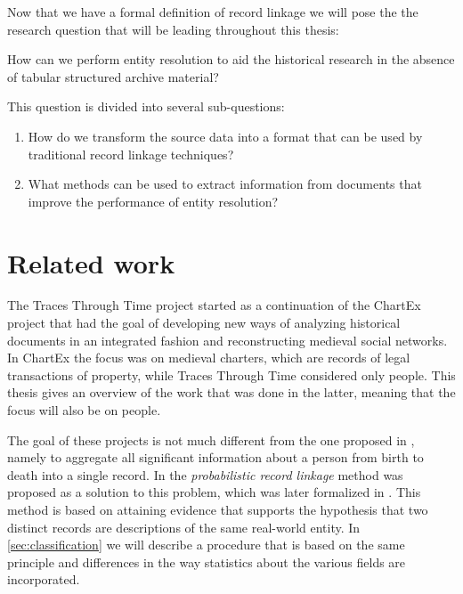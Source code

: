 Now that we have a formal definition of record linkage we will pose the the research question that will be leading throughout this thesis:

\begin{question*}
    How can we perform entity resolution to aid the historical research in the absence of tabular structured archive material?
\end{question*}

\noindent This question is divided into several sub-questions:

\begin{enumerate}[label=\emph{\roman*.}]
    \item How do we transform the source data into a format that can be used by traditional record linkage techniques?
    \item What methods can be used to extract information from documents that improve the performance of entity resolution?
\end{enumerate}




\section{Related work}
\label{sec:related_work}

The Traces Through Time project started as a continuation of the ChartEx \citep{Knobbe2014} project that had the goal of developing new ways of analyzing historical documents in an integrated fashion and reconstructing medieval social networks.
In ChartEx the focus was on medieval charters, which are records of legal transactions of property, while Traces Through Time considered only people.
This thesis gives an overview of the work that was done in the latter, meaning that the focus will also be on people.

The goal of these projects is not much different from the one proposed in \citep{Dunn1946}, namely to aggregate all significant information about a person from birth to death into a single record.
In \citep{Newcombe1959} the \emph{probabilistic record linkage} method was proposed as a solution to this problem, which was later formalized in \citep{Fellegi1969}.
This method is based on attaining evidence that supports the hypothesis that two distinct records are descriptions of the same real-world entity.
In \cref{sec:classification} we will describe a procedure that is based on the same principle and differences in the way statistics about the various fields are incorporated.

